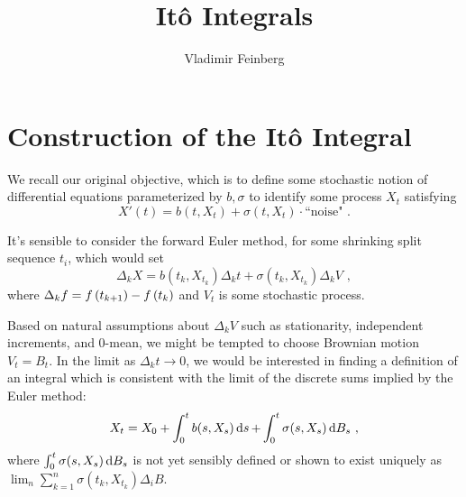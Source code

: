 \documentclass{article}
\title{It\^{o} Integrals}
\author{Vladimir Feinberg}
\begin{document}
\maketitle

\section{Construction of the It\^{o} Integral}

We recall our original objective, which is to define some stochastic notion of differential equations parameterized by \(b,\sigma\) to identify some process \(X_t\) satisfying
\[
X'(t) = b(t, X_t)+\sigma(t, X_t)\cdot \text{``noise"}\,\,.
\]

It's sensible to consider the forward Euler method, for some shrinking split sequence \(t_i\), which would set
\[
  \Delta_kX=b(t_k, X_{t_k})\Delta_k t+\sigma(t_k, X_{t_k})\Delta_k V\,\,,
  \]
  where \(\Delta_k f=f\left({t_{k+1}}\right)-f\left({t_{k}}\right)\) and \(V_t\) is some stochastic process.

  Based on natural assumptions about \(\Delta_k V\) such as stationarity, independent increments, and 0-mean, we might be tempted to choose Brownian motion \(V_t=B_t\). In the limit as \(\Delta_kt\rightarrow 0\), we would be interested in finding a definition of an integral which is consistent with the limit of the discrete sums implied by the Euler method:
  \[
X_t=X_0+\int_0^t b(s, X_s)\mathop{\mathrm{d} s }+\int_0^t\sigma(s, X_s)\mathop{\mathrm{d} B_s }\,\,,
\]
where \(\int_0^t\sigma(s, X_s)\mathop{\mathrm{d} B_s }\) is not yet sensibly defined or shown to exist uniquely as \(\lim_n\sum_{k=1}^n\sigma(t_k, X_{t_k})\Delta_i B\).
\end{document}
